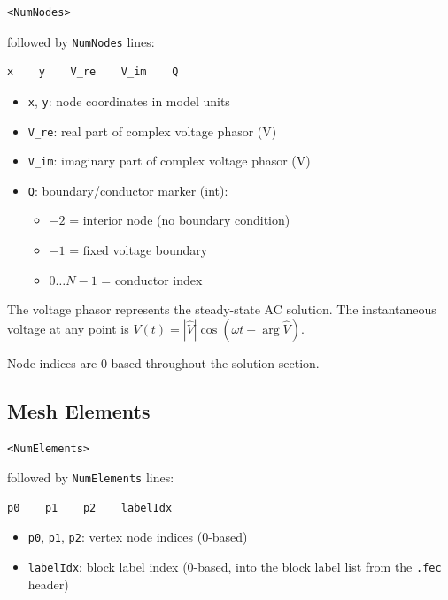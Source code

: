 \documentclass[11pt]{article}
\begin{document}
\begin{lstlisting}
<NumNodes>
\end{lstlisting}

followed by \texttt{NumNodes} lines:

\begin{lstlisting}
x    y    V_re    V_im    Q
\end{lstlisting}

\begin{itemize}[nosep]
  \item \texttt{x}, \texttt{y}: node coordinates in model units
  \item \texttt{V\_re}: real part of complex voltage phasor (V)
  \item \texttt{V\_im}: imaginary part of complex voltage phasor (V)
  \item \texttt{Q}: boundary/conductor marker (int):
    \begin{itemize}[nosep]
      \item $-2$ = interior node (no boundary condition)
      \item $-1$ = fixed voltage boundary
      \item $0 \ldots N-1$ = conductor index
    \end{itemize}
\end{itemize}

The voltage phasor represents the steady-state AC solution.  The
instantaneous voltage at any point is $V(t) = |\hat{V}| \cos(\omega t
+ \arg\hat{V})$.

Node indices are 0-based throughout the solution section.

\subsection{Mesh Elements}

\begin{lstlisting}
<NumElements>
\end{lstlisting}

followed by \texttt{NumElements} lines:

\begin{lstlisting}
p0    p1    p2    labelIdx
\end{lstlisting}

\begin{itemize}[nosep]
  \item \texttt{p0}, \texttt{p1}, \texttt{p2}: vertex node indices (0-based)
  \item \texttt{labelIdx}: block label index (0-based, into the block
        label list from the \texttt{.fec} header)
\end{itemize}
\end{document}
